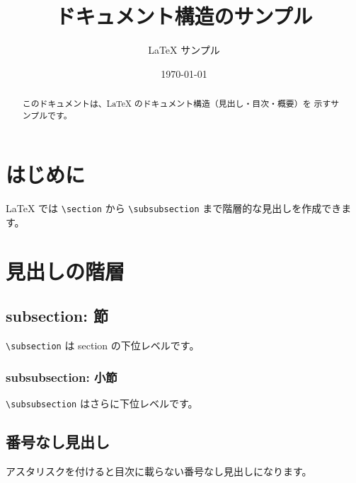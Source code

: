 \documentclass[lualatex,ja=standard]{bxjsarticle}
\title{ドキュメント構造のサンプル}
\author{LaTeX サンプル}
\date{\today}
\begin{document}
\maketitle          %
\tableofcontents    %

\begin{abstract}
  このドキュメントは、LaTeX のドキュメント構造（見出し・目次・概要）を
  示すサンプルです。
\end{abstract}

\section{はじめに}

LaTeX では \texttt{\textbackslash section} から \texttt{\textbackslash subsubsection}
まで階層的な見出しを作成できます。

\section{見出しの階層}

\subsection{subsection: 節}

\texttt{\textbackslash subsection} は section の下位レベルです。

\subsubsection{subsubsection: 小節}

\texttt{\textbackslash subsubsection} はさらに下位レベルです。

\subsection{番号なし見出し}

アスタリスクを付けると目次に載らない番号なし見出しになります。
\end{document}
